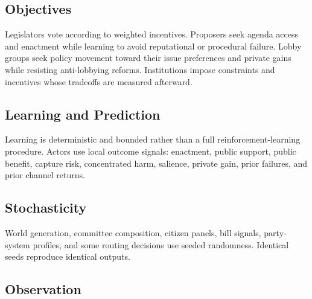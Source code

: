 \documentclass[manuscript]{acmart}
\begin{document}
\subsection{Objectives}

Legislators vote according to weighted incentives. Proposers seek agenda access and enactment while learning to avoid reputational or procedural failure. Lobby groups seek policy movement toward their issue preferences and private gains while resisting anti-lobbying reforms. Institutions impose constraints and incentives whose tradeoffs are measured afterward.

\subsection{Learning and Prediction}

Learning is deterministic and bounded rather than a full reinforcement-learning procedure. Actors use local outcome signals: enactment, public support, public benefit, capture risk, concentrated harm, salience, private gain, prior failures, and prior channel returns.

\subsection{Stochasticity}

World generation, committee composition, citizen panels, bill signals, party-system profiles, and some routing decisions use seeded randomness. Identical seeds reproduce identical outputs.

\subsection{Observation}
\end{document}
